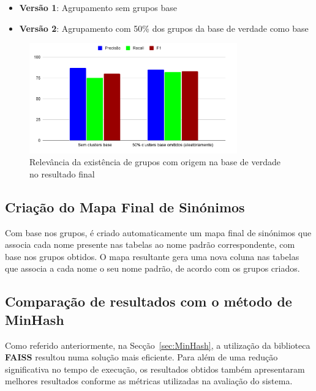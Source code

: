 \documentclass[a4paper,12pt]{article}
\begin{document}
\begin{itemize}
    \item \textbf{Versão 1}: Agrupamento sem grupos base
    \item \textbf{Versão 2}: Agrupamento com 50\% dos grupos da base de verdade como base
\end{itemize}
\newpage
\begin{figure}[h!]
    \centering
    \includegraphics[width=0.8\textwidth]{images/clusterbase.png}
    \caption{Relevância da existência de grupos com origem na base de verdade no resultado final}
    \label{fig:design}
\end{figure}

\subsection{Criação do Mapa Final de Sinónimos}

Com base nos grupos, é criado automaticamente um mapa final de sinónimos que associa cada nome presente nas tabelas ao nome padrão correspondente, com base nos grupos obtidos. O mapa resultante gera uma nova coluna nas tabelas que associa a cada nome o seu nome padrão, de acordo com os grupos criados.

\subsection{Comparação de resultados com o método de MinHash}

Como referido anteriormente, na Secção~\ref{sec:MinHash}, a utilização da biblioteca \textbf{FAISS} resultou numa solução mais eficiente. Para além de uma redução significativa no tempo de execução, os resultados obtidos também apresentaram melhores resultados conforme as métricas utilizadas na avaliação do sistema.

\end{document}
